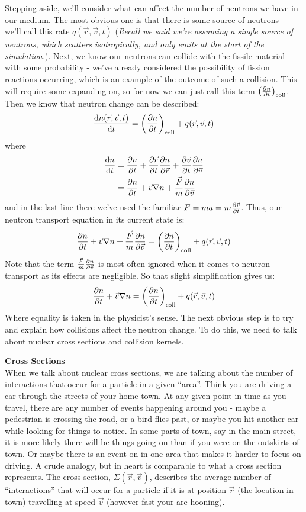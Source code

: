 Stepping aside, we'll consider what can affect the number of neutrons we have in our medium. The most obvious one is that there 
is some source of neutrons - we'll call this rate $q(\vec{r}, \vec{v}, t)$ (\textit{Recall we said we're assuming a single source of neutrons, which scatters isotropically, and only emits at the start 
of the simulation.}). Next, we know our neutrons can collide with the fissile material with 
some probability - we've already considered the possibility of fission reactions occurring, which is an example of the outcome 
of such a collision. This will require some expanding on, so for now we can just call this 
term $\left ( \pdv{n}{t} \right )_\text{coll}$. Then we know that neutron change can be described:
$$\dv{n(\vec{r}, \vec{v}, t)}{t} = \left ( \pdv{n}{t} \right )_\text{coll} + q(\vec{r}, \vec{v}, t) $$
where
\begin{align*}
    \dv{n}{t} &= \pdv{n}{t} + \pdv{\vec{r}}{t} \pdv{n}{\vec{r}} + \pdv{\vec{v}}{t} \pdv{n}{\vec{v}} \\
    &= \pdv{n}{t} + \vec{v} \nabla n + \frac{\vec{F}}{m} \pdv{n}{\vec{v}}
\end{align*}
and in the last line there we've used the familiar $F = ma = m \pdv{\vec{v}}{t}$. Thus, our neutron transport equation 
in its current state is:
$$\pdv{n}{t} + \vec{v} \nabla n + \frac{\vec{F}}{m} \pdv{n}{\vec{v}}= \left ( \pdv{n}{t} \right )_\text{coll} + q(\vec{r}, \vec{v}, t) $$
Note that the term $\frac{\vec{F}}{m} \pdv{n}{\vec{v}}$ is most often ignored when it comes to neutron transport as its effects are negligible.
So that slight simplification gives us:
$$\pdv{n}{t} + \vec{v} \nabla n = \left ( \pdv{n}{t} \right )_\text{coll} + q(\vec{r}, \vec{v}, t) $$
Where equality is taken in the physicist's sense. The next obvious step is to try and explain how collisions affect the neutron change. To do this, 
we need to talk about nuclear cross sections and collision kernels.

\noindent \textbf{Cross Sections}\\
When we talk about nuclear cross sections, we are talking about the number of interactions that occur for a particle in a given ``area''. 
Think you are driving a car through the streets of your home town. At any given point in time as you travel, there are any number of events 
happening around you - maybe a pedestrian is crossing the road, or a bird flies past, or maybe you hit another car while looking for 
things to notice. In some parts of town, say in the main street, it is more likely there will be things going on than if you were on the 
outskirts of town. Or maybe there is an event on in one area that makes it harder to focus on driving. A crude analogy, but 
in heart is comparable to what a cross section represents. The cross section, $\Sigma(\vec{r}, \vec{v})$, describes the average 
number of ``interactions'' that will occur for a particle if it is at position $\vec{r}$ (the location in town) travelling 
at speed $\vec{v}$ (however fast your are hooning). 


